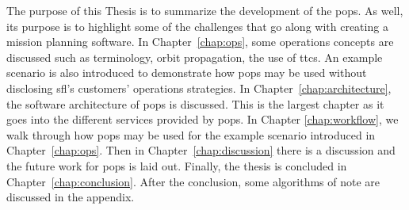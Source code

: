 The purpose of this Thesis is to summarize the development of the
\acrlong{pops}. As well, its purpose is to highlight some of the challenges
that go along with creating a mission planning software. In
Chapter~\ref{chap:ops}, some operations concepts are discussed such as
terminology, orbit propagation, the use of \glspl{ttc}. An example scenario is
also introduced to demonstrate how \gls{pops} may be used without disclosing
\gls{sfl}'s customers' operations strategies. In
Chapter~\ref{chap:architecture}, the software architecture of \gls{pops} is
discussed. This is the largest chapter as it goes into the different services
provided by \gls{pops}. In Chapter \ref{chap:workflow}, we walk through how
\gls{pops} may be used for the example scenario introduced in
Chapter~\ref{chap:ops}. Then in Chapter~\ref{chap:discussion} there is a
discussion and the future work for \gls{pops} is laid out. Finally, the thesis
is concluded in Chapter~\ref{chap:conclusion}.  After the conclusion, some
algorithms of note are discussed in the appendix.




